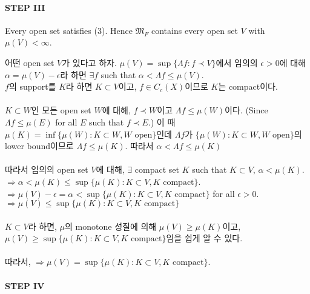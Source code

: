 \documentclass[11pt,reqno]{amsart}
\renewcommand{\(}{\left(}
\renewcommand{\)}{\right)}
\renewcommand{\[}{\left[}
\renewcommand{\]}{\right]}
\newcommand{\ep}{\epsilon}
\newenvironment{textbox}
  {\begin{tcolorbox}[
    colback=gray!10, 
    colframe=gray!50, 
    boxrule=0.5pt,
    fontupper=\normalfont
  ]}
  {\end{tcolorbox}}
\newcommand{\subheading}[1]{\vspace{1em}{\noindent\large\bfseries \textlangle{} #1 \textrangle{} \par}\vspace{1em}}
\newcommand{\M}{\mathfrak{M}}
\begin{document}
\paragraph{STEP III}

\begin{textbox}
  Every open set satisfies (3). Hence $\M_F$ contains every open set $V$ with $\mu(V) < \infty$.
\end{textbox}

\subheading{proof}

어떤 open set $V$가 있다고 하자. $\mu(V) = \sup \{ \Lambda f : f \prec V \}$에서 
임의의 $\ep > 0$에 대해 $\alpha = \mu(V) - \ep$라 하면 $\exists f$ such that $\alpha < \Lambda f \le \mu(V)$. \\
$f$의 support를 $K$라 하면 $K \subset V$이고, $f \in C_c(X)$이므로 $K$는 compact이다. \\ \\

$K \subset W$인 모든 open set $W$에 대해, $f \prec W$이고 $\Lambda f \le \mu(W)$이다. 
(Since $\Lambda f \le \mu(E)$ for all $E$ such that $f \prec E$.) 이 때 
$\mu (K) = \inf \{ \mu(W) : K \subset W, W \text{ open} \}$인데 $\Lambda f$가 
$\{ \mu(W) : K \subset W, W \text{ open} \}$의 lower bound이므로 $\Lambda f \le \mu (K)$. 따라서 $\alpha < \Lambda f \le \mu (K)$\\ \\

따라서 임의의 open set $V$에 대해, $\exists$ compact set $K$ such that $K \subset V$, $\alpha < \mu (K)$. \\
$\Rightarrow \alpha < \mu (K) \le \sup \{ \mu (K) : K \subset V, K \text{ compact} \}$. \\
$\Rightarrow \mu(V) - \ep = \alpha < \sup \{ \mu (K) : K \subset V, K \text{ compact} \}$ for all $\ep > 0$. \\
$\Rightarrow \mu(V) \le \sup \{ \mu (K) : K \subset V, K \text{ compact} \}$ \\ \\

$K \subset V$라 하면, $\mu$의 monotone 성질에 의해 $\mu(V) \ge \mu(K)$이고, 
$\mu(V) \ge \sup \{ \mu (K) : K \subset V, K \text{ compact} \}$임을 쉽게 알 수 있다. \\ \\
따라서, $\Rightarrow \mu(V) = \sup \{ \mu (K) : K \subset V, K \text{ compact} \}$.

\paragraph{STEP IV}
\end{document}
